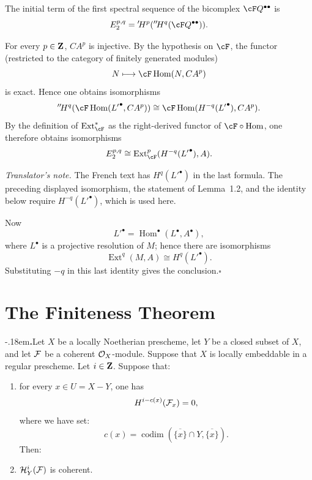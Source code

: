 The initial term of the first spectral sequence of the bicomplex
$\cF Q^{\bullet\bullet}$ is
\[
  E_2^{p,q}
  ={}'\!H^p({}''\!H^q(\cF Q^{\bullet\bullet})).
\]

For every $p\in\mathbf Z$, $CA^p$ is injective. By the hypothesis on $\cF$, the
functor (restricted to the category of finitely generated modules)
\[
  N\longmapsto \cF\operatorname{Hom}(N,CA^p)
\]
is exact. Hence one obtains isomorphisms
\[
  {}''\!H^q(\cF\operatorname{Hom}({L'}^\bullet,CA^p))
  \cong
  \cF\operatorname{Hom}(H^{-q}({L'}^\bullet),CA^p).
\]
By the definition of $\operatorname{Ext}^{\ast}_{\cF}$ as the right-derived functor
of $\cF\circ\operatorname{Hom}$, one therefore obtains isomorphisms
\[
  E_2^{p,q}
  \cong
  \operatorname{Ext}^{p}_{\cF}(H^{-q}({L'}^\bullet),A).
\]

\noindent\emph{Translator's note.} The French text has
$H^q({L'}^\bullet)$ in the last formula. The preceding displayed
isomorphism, the statement of Lemma~1.2, and the identity below require
$H^{-q}({L'}^\bullet)$, which is used here.

Now
\[
  {L'}^\bullet=\operatorname{Hom}^\bullet(L^\bullet,A^\bullet),
\]
where $L^\bullet$ is a projective resolution of $M$; hence there are
isomorphisms
\[
  \operatorname{Ext}^{q}(M,A)\cong H^q({L'}^\bullet).
\]
Substituting $-q$ in this last identity gives the conclusion.\hfill$\square$


\let\cF\calF\renewcommand{\theequation}{\thesection.\arabic{equation}}

\setcounter{section}{1}
\section{The Finiteness Theorem}\label{VIII.2}

\begin{theorem}\label{VIII.2.1}
\kern-.18em\textbf{.}\enspace Let $X$ be a locally Noetherian prescheme, let $Y$ be a closed subset of $X$,
and let $\cF$ be a coherent $\mathcal O_X$-module. Suppose that $X$ is locally
embeddable in a regular prescheme. Let $i\in\mathbf Z$. Suppose that:
\begin{enumerate}[label=\textup{\alph*)},leftmargin=2.2em,itemsep=0.5\baselineskip]
\item for every $x\in U=X-Y$, one has
\begin{equation*}
  H^{i-c(x)}(\cF_x)=0,
\end{equation*}
where we have set:
\begin{equation}\label{eq:VIII.2.1}
  c(x)=\operatorname{codim}
  (\overline{\{x\}}\cap Y,\overline{\{x\}}).
\end{equation}
Then:
\item $\mathcal H^i_Y(\cF)$ is coherent.
\end{enumerate}
\end{theorem}


